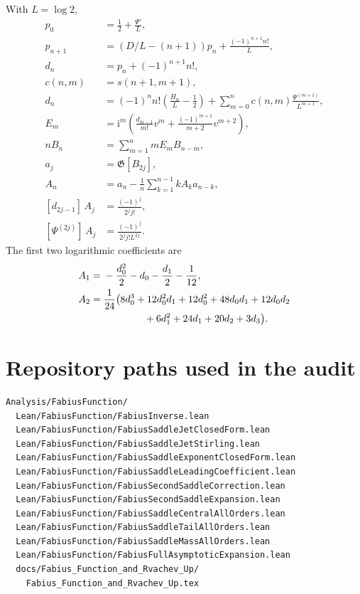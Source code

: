 \documentclass[11pt,oneside]{article}
\theoremstyle{definition}
\theoremstyle{remark}
\newcommand{\ii}{\mathrm i}
\newcommand{\Gauss}{\mathfrak G}
\begin{document}
With $L=\log2$,
\begin{align*}
p_0&=\frac12+\frac{\Psi'}L,\\
p_{n+1}&=(D/L-(n+1))p_n+\frac{(-1)^{n+1}n!}{L},\\
d_n&=p_n+(-1)^{n+1}n!,\\
c(n,m)&=s(n+1,m+1),\\
d_n&=(-1)^nn!\left(\frac{H_n}{L}-\frac12\right)
 +\sum_{m=0}^nc(n,m)\frac{\Psi^{(m+1)}}{L^{m+1}},\\
E_m&=\ii^m\left(\frac{d_{m-1}}{m!}v^m+
          \frac{(-1)^{m+1}}{m+2}v^{m+2}\right),\\
nB_n&=\sum_{m=1}^n mE_mB_{n-m},\\
a_j&=\Gauss[B_{2j}],\\
A_n&=a_n-\frac1n\sum_{k=1}^{n-1}kA_ka_{n-k},\\
[d_{2j-1}]\,A_j&=\frac{(-1)^j}{2^jj!},\\
[\Psi^{(2j)}]\,A_j&=\frac{(-1)^j}{2^jj!L^{2j}}.
\end{align*}
The first two logarithmic coefficients are
\begin{align*}
A_1={}&-\frac{d_0^2}{2}-d_0-\frac{d_1}{2}-\frac1{12},\\
A_2={}&\frac1{24}\bigl(
8d_0^3+12d_0^2d_1+12d_0^2+48d_0d_1+12d_0d_2\\
&\hspace{4.1em}{}+6d_1^2+24d_1+20d_2+3d_3
\bigr).
\end{align*}

\section{Repository paths used in the audit}
\label{app:paths}

\begin{lstlisting}[style=pseudo]
Analysis/FabiusFunction/
  Lean/FabiusFunction/FabiusInverse.lean
  Lean/FabiusFunction/FabiusSaddleJetClosedForm.lean
  Lean/FabiusFunction/FabiusSaddleJetStirling.lean
  Lean/FabiusFunction/FabiusSaddleExponentClosedForm.lean
  Lean/FabiusFunction/FabiusSaddleLeadingCoefficient.lean
  Lean/FabiusFunction/FabiusSecondSaddleCorrection.lean
  Lean/FabiusFunction/FabiusSecondSaddleExpansion.lean
  Lean/FabiusFunction/FabiusSaddleCentralAllOrders.lean
  Lean/FabiusFunction/FabiusSaddleTailAllOrders.lean
  Lean/FabiusFunction/FabiusSaddleMassAllOrders.lean
  Lean/FabiusFunction/FabiusFullAsymptoticExpansion.lean
  docs/Fabius_Function_and_Rvachev_Up/
    Fabius_Function_and_Rvachev_Up.tex
\end{lstlisting}
\end{document}
